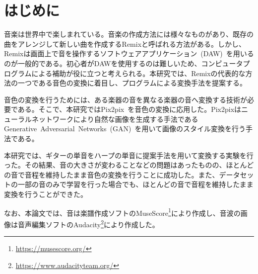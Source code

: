 \chapter{はじめに}

音楽は世界中で楽しまれている。音楽の作成方法には様々なものがあり、既存の曲をアレンジして新しい曲を作成するRemixと呼ばれる方法がある。しかし、Remixは画面上で音を操作するソフトウェアアプリケーション~(DAW)~を用いるのが一般的である。初心者がDAWを使用するのは難しいため、コンピュータプログラムによる補助が役に立つと考えられる。本研究では、Remixの代表的な方法の一つである音色の変換に着目し、プログラムによる変換手法を提案する。

音色の変換を行うためには、ある楽器の音を異なる楽器の音へ変換する技術が必要である。そこで、本研究ではPix2pix~\cite{pix2pix}を音色の変換に応用した。Pix2pixはニューラルネットワークにより自然な画像を生成する手法であるGenerative~Adversarial~Networks~(GAN)~\cite{GAN}を用いて画像のスタイル変換を行う手法である。

本研究では、ギターの単音をハープの単音に提案手法を用いて変換する実験を行った。その結果、音の大きさが変わることなどの問題はあったものの、ほとんどの音で音程を維持したまま音色の変換を行うことに成功した。また、データセットの一部の音のみで学習を行った場合でも、ほとんどの音で音程を維持したまま変換を行うことができた。

なお、本論文では、音は楽譜作成ソフトのMuseScore\footnote{\url{https://musescore.org/}}により作成し、音波の画像は音声編集ソフトのAudacity\footnote{\url{https://www.audacityteam.org/}}により作成した。

\begin{comment}
既存研究の軽い紹介…。GAN,Pix2pix…。音楽の変換の研究(Hukebox,スペクトログラム,MIDI)…。この手法では…。音色の変換のみを扱うことで短期的な構造のみに着目できる点で他の音楽生成の研究よりも計算時間を削減できると期待される。
~\cite{Jukebox}
\end{comment}